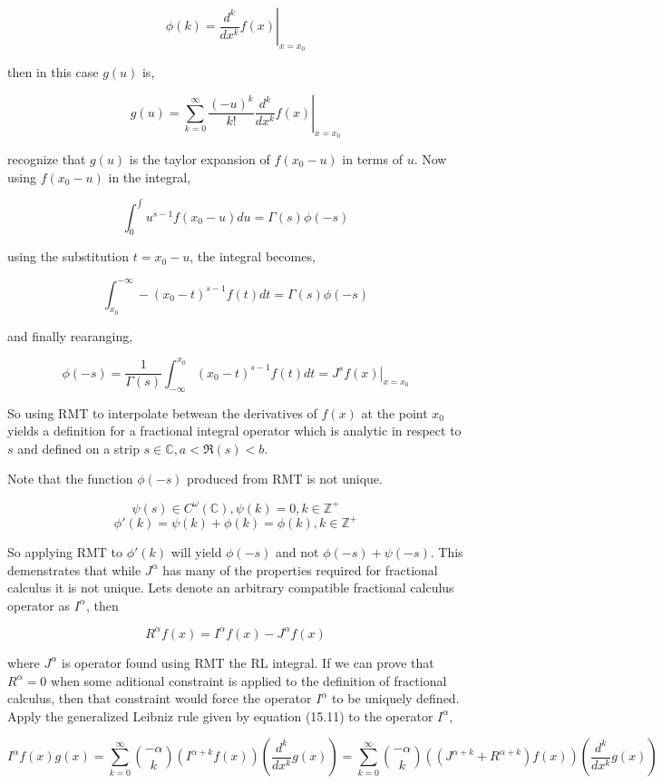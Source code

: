 \documentclass[%
 preprint,
 amsmath, amssymb, aps, pra, 10pt
]{revtex4-2}
\begin{document}
\[\phi(k) = \left. \frac{d^k}{dx^k}f(x)\right|_{x = x_0}\]

then in this case $g(u)$ is,

\[g(u) = \sum_{k=0}^\infty \frac{(-u)^k}{k!} \left. \frac{d^k}{dx^k}f(x)\right|_{x=x_0}\]

recognize that $g(u)$ is the taylor expansion of $f(x_0 - u)$ in terms of $u$. Now using $f(x_0 - u)$ in the integral,

\[\int_0^{\int} u^{s-1}f(x_0 - u)du = \Gamma(s)\phi(-s)\]

using the substitution $t = x_0 - u$, the integral becomes,


\[\int_{x_0}^{-\infty} -(x_0 - t)^{s-1}f(t)dt = \Gamma(s)\phi(-s)\]

and finally rearanging,

\[\phi(-s) = \frac{1}{\Gamma(s)} \int_{-\infty}^{x_0} (x_0 - t)^{s-1} f(t)dt = \left. J^s f(x)\right|_{x = x_0}\]

So using RMT to interpolate betwean the derivatives of $f(x)$ at the point $x_0$ yields a definition for a fractional integral operator which is analytic in respect to $s$ and defined on a strip $s \in \mathbb{C}, a < \mathfrak{R}(s) < b$.

Note that the function $\phi(-s)$ produced from RMT is not unique.

\[\psi(s) \in C^{\omega}(\mathbb{C}), \psi(k) = 0, k \in \mathbb{Z}^+\]
\[\phi'(k) = \psi(k) + \phi(k) = \phi(k), k \in \mathbb{Z}^+\]

So applying RMT to $\phi'(k)$ will yield $\phi(-s)$ and not $\phi(-s) + \psi(-s)$. This demenstrates that while $J^\alpha$ has many of the properties required for fractional calculus it is not unique. Lets denote an arbitrary compatible fractional calculus operator as $I^\alpha$, then

\[R^\alpha f(x) = I^\alpha f(x) - J^\alpha f(x)\]

where $J^\alpha$ is operator found using RMT the RL integral. If we can prove that $R^\alpha = 0$ when some aditional constraint is applied to the definition of fractional calculus, then that constraint would force the operator $I^\alpha$ to be uniquely defined. Apply the generalized Leibniz rule given by \cite{Leibniz} equation (15.11) to the operator $I^\alpha$,

\[I^\alpha f(x)g(x) = \sum_{k=0}^\infty \binom{-\alpha}{k}\left( I^{\alpha + k}f(x) \right)\left( \frac{d^k}{dx^k} g(x)\right) = \sum_{k=0}^\infty \binom{-\alpha}{k}\left( \left(J^{\alpha + k} + R^{\alpha + k}\right)f(x) \right)\left( \frac{d^k}{dx^k} g(x)\right)\]
\end{document}
